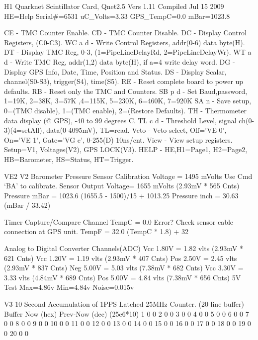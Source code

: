 \documentclass[letterpaper,10pt,english]{sphinxmanual}
\begin{document}
H1
Quarknet Scintillator Card,  Qnet2.5  Vers 1.11  Compiled Jul 15 2009  HE=Help
Serial\#=6531     uC\_Volts=3.33      GPS\_TempC=0.0     mBar=1023.8

CE     - TMC Counter Enable.
CD     - TMC Counter Disable.
DC     - Display Control Registers, (C0-C3).
WC a d - Write   Control Registers, addr(0-6) data byte(H).
DT     - Display TMC Reg, 0-3, (1=PipeLineDelayRd, 2=PipeLineDelayWr).
WT a d - Write   TMC Reg, addr(1,2) data byte(H), if a=4 write delay word.
DG     - Display GPS Info, Date, Time, Position and Status.
DS     - Display Scalar, channel(S0-S3), trigger(S4), time(S5).
RE     - Reset complete board to power up defaults.
RB     - Reset only the TMC and Counters.
SB p d - Set Baud,password, 1=19K, 2=38K, 3=57K ,4=115K, 5=230K, 6=460K, 7=920K
SA n   - Save setup, 0=(TMC disable), 1=(TMC enable), 2=(Restore Defaults).
TH     - Thermometer data display (@ GPS), -40 to 99 degrees C.
TL c d - Threshold Level, signal ch(0-3)(4=setAll), data(0-4095mV), TL=read.
Veto   - Veto select, Off='VE 0', On='VE 1', Gate='VG c', 0-255(D) 10ns/cnt.
View   - View setup registers. Setup=V1, Voltages(V2), GPS LOCK(V3).
HELP   - HE,H1=Page1, H2=Page2, HB=Barometer, HS=Status, HT=Trigger.

VE2
V2
Barometer Pressure Sensor
Calibration Voltage  = 1495 mVolts   Use Cmd `BA' to calibrate.
Sensor Output Voltage= 1655 mVolts   (2.93mV *  565 Cnts)
Pressure mBar        = 1023.6        (1655.5 - 1500)/15 + 1013.25
Pressure inch        = 30.63         (mBar / 33.42)

Timer Capture/Compare Channel
TempC  = 0.0     Error?  Check sensor cable connection at GPS unit.
TempF  = 32.0    (TempC * 1.8) + 32

Analog to Digital Converter Channels(ADC)
Vcc 1.80V = 1.82 vlts     (2.93mV *  621 Cnts)
Vcc 1.20V = 1.19 vlts     (2.93mV *  407 Cnts)
Pos 2.50V = 2.45 vlts     (2.93mV *  837 Cnts)
Neg 5.00V = 5.03 vlts     (7.38mV *  682 Cnts)
Vcc 3.30V = 3.33 vlts     (4.84mV *  689 Cnts)
Pos 5.00V = 4.84 vlts     (7.38mV *  656 Cnts)
5V Test    Max=4.86v    Min=4.84v    Noise=0.015v

V3
10 Second Accumulation of 1PPS Latched 25MHz Counter. (20 line buffer)
Buffer     Now (hex)     Prev-Now (dec) (25e6*10)
1              0               0
2              0               0
3              0               0
4              0               0
5              0               0
6              0               0
7              0               0
8              0               0
9              0               0
10              0               0
11              0               0
12              0               0
13              0               0
14              0               0
15              0               0
16              0               0
17              0               0
18              0               0
19              0               0
20              0               0
\end{document}
